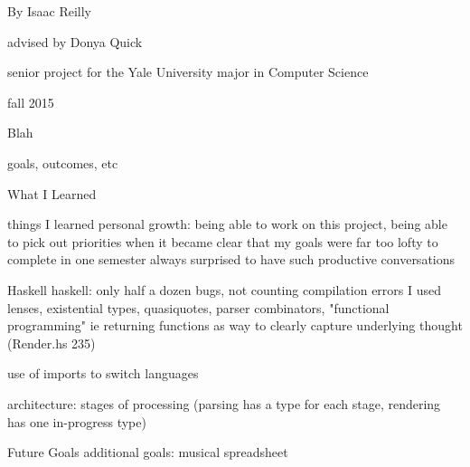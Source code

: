 \documentclass{article}
\begin{document}
\pagestyle{empty}
\begin{center}
\vspace{3cm}

\vspace{2cm}
{\Large By Isaac Reilly}

\vspace{0.15cm}
{\large advised by Donya Quick}

\vspace{0.1cm}
{senior project for the Yale University major in Computer Science}

\vspace{13cm}

{\small fall 2015}

\end{center}

\pagebreak


\begin{section}{Blah}

goals, outcomes, etc
\end{section}


\begin{section}{What I Learned}

things I learned
personal growth: being able to work on 
this project, being able to pick out priorities 
when it became clear that my goals were far too lofty
to complete in one semester
always surprised to have such productive conversations

\end{section}


\begin{section}{Haskell}
haskell: only half a dozen bugs, not counting compilation errors
I used lenses, existential types, quasiquotes, parser combinators,
"functional programming" ie returning functions as way to clearly capture underlying thought
(Render.hs 235)

use of imports to switch languages

architecture: stages of processing (parsing has a type for each stage, rendering has one in-progress type)

\end{section}

\begin{section}{Future Goals}
additional goals: musical spreadsheet
\end{section}
\end{document}
